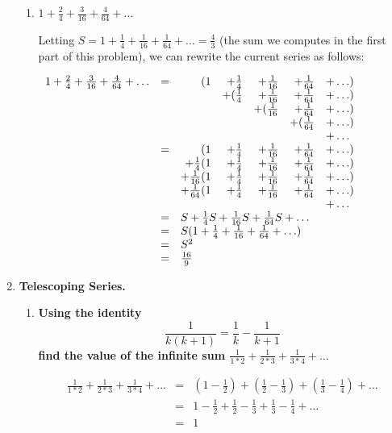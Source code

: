 \documentclass[12pt]{amsart}
\begin{document}
\begin{enumerate}
\begin{enumerate}
\item {\bf $1 + \frac{2}{4} + \frac{3}{16} + \frac{4}{64} + \ldots$}

Letting $S = 1 + \frac{1}{4} + \frac{1}{16} + \frac{1}{64} + \ldots =
\frac{4}{3}$ (the sum we computes in the first part of this problem), we can rewrite
the current series as follows:

$
\begin{array}{lcrrrrl}
1 + \frac{2}{4} + \frac{3}{16} + \frac{4}{64} + \ldots & = & (1 & +\frac{1}{4} & + \frac{1}{16} & + \frac{1}{64} & + \ldots) \\
& & & +(\frac{1}{4} & + \frac{1}{16} & + \frac{1}{64} & + \ldots) \\
& & & & + (\frac{1}{16} & + \frac{1}{64} & + \ldots) \\
& & & & & + (\frac{1}{64} & + \ldots) \\
& & & & & & + \ldots \\
& = & (1 & + \frac{1}{4} & + \frac{1}{16} & + \frac{1}{64} & + \ldots) \\
&  & +\frac{1}{4}(1 & + \frac{1}{4} & + \frac{1}{16} & + \frac{1}{64} & + \ldots) \\
&  & +\frac{1}{16}(1 & + \frac{1}{4} & + \frac{1}{16} & + \frac{1}{64} & + \ldots) \\
&  & +\frac{1}{64}(1 & + \frac{1}{4} & + \frac{1}{16} & + \frac{1}{64} & + \ldots) \\
& & & & & & + \ldots \\
& = & \multicolumn{5}{l}{S + \frac{1}{4}S + \frac{1}{16}S + \frac{1}{64}S + \ldots} \\
& = & \multicolumn{5}{l}{S(1 + \frac{1}{4} + \frac{1}{16} + \frac{1}{64} + \ldots)} \\
& = & \multicolumn{5}{l}{S^2} \\
& = & \multicolumn{5}{l}{\frac{16}{9}} \\
\end{array}
$
\end{enumerate}

\medskip

\item {\bf Telescoping Series.}
\begin{enumerate}
\item {\bf Using the identity
$$
\frac{1}{k(k+1)} = \frac{1}{k} - \frac{1}{k+1}
$$
find the value of the infinite sum $\frac{1}{1*2} + \frac{1}{2*3} + \frac{1}{3*4} + \ldots$}

\begin{eqnarray*}
\frac{1}{1*2} + \frac{1}{2*3} + \frac{1}{3*4} + \ldots & = & (1 - \frac{1}{2}) + (\frac{1}{2} - \frac{1}{3}) + (\frac{1}{3} - \frac{1}{4}) + \ldots \\
& = & 1 - \frac{1}{2} + \frac{1}{2} - \frac{1}{3} + \frac{1}{3} - \frac{1}{4} + \ldots \\
& = & 1 \\
\end{eqnarray*}


\end{enumerate}
\end{enumerate}
\end{document}
